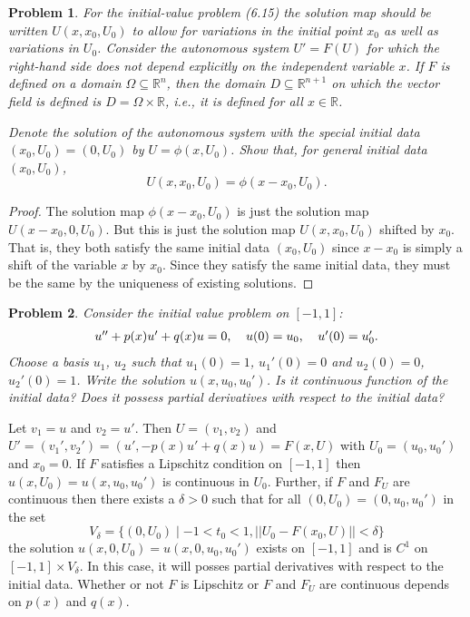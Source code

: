 \documentclass{article}
\newtheorem{problem}{Problem}
\begin{document}
\begin{problem}
For the initial-value problem (6.15) the solution map should be written $U(x,x_0,U_0)$ to allow for variations in the initial point $x_0$ as well as variations in $U_0$. Consider the \emph{autonomous} system $U' = F(U)$ for which the right-hand side does not depend explicitly on the independent variable $x$. If $F$ is defined on a domain $\Omega \subseteq \mathbb{R}^n$, then the domain $D \subseteq \mathbb{R}^{n+1}$ on which the vector field is defined is $D = \Omega \times \mathbb{R}$, i.e., it is defined for all $x \in \mathbb{R}$.

Denote the solution of the autonomous system with the special initial data $(x_0, U_0) = (0, U_0)$ by $U = \phi(x, U_0)$. Show that, for general initial data $(x_0, U_0)$,
\[
U(x,x_0,U_0) = \phi(x-x_0, U_0).
\]
\end{problem}
\begin{proof}
The solution map $\phi(x - x_0, U_0)$ is just the solution map $U(x-x_0, 0, U_0)$. But this is just the solution map $U(x, x_0, U_0)$ shifted by $x_0$. That is, they both satisfy the same initial data $(x_0, U_0)$ since $x - x_0$ is simply a shift of the variable $x$ by $x_0$. Since they satisfy the same initial data, they must be the same by the uniqueness of existing solutions.
\end{proof}

\begin{problem}
Consider the initial value problem on $[-1,1]$:
\[
\begin{tabular}{ccc}
$u'' + p(x)u' + q(x)u = 0$, & $u(0) = u_0$, & $u'(0) = u_0'$.
\end{tabular}
\]
Choose a basis $u_1$, $u_2$ such that $u_1(0) = 1$, $u_1'(0) = 0$ and $u_2(0) = 0$, $u_2'(0) = 1$. Write the solution $u(x,u_0,u_0')$. Is it continuous function of the initial data? Does it possess partial derivatives with respect to the initial data?
\end{problem}

Let $v_1 = u$ and $v_2 = u'$. Then $U = (v_1, v_2)$ and $U' = (v_1', v_2') = (u', -p(x)u' + q(x)u) = F(x,U)$ with $U_0 = (u_0, u_0')$ and $x_0 = 0$. If $F$ satisfies a Lipschitz condition on $[-1,1]$ then $u(x, U_0) = u(x, u_0, u_0')$ is continuous in $U_0$. Further, if $F$ and $F_U$ are continuous then there exists a $\delta > 0$ such that for all $(0, U_0) = (0, u_0, u_0')$ in the set
\[
V_{\delta} = \{ (0, U_0) \mid -1 < t_0 < 1, ||U_0 - F(x_0, U)|| < \delta \}
\]
the solution $u(x, 0, U_0) = u(x, 0, u_0, u_0')$ exists on $[-1,1]$ and is $C^1$ on $[-1,1] \times V_{\delta}$. In this case, it will posses partial derivatives with respect to the initial data. Whether or not $F$ is Lipschitz or $F$ and $F_U$ are continuous depends on $p(x)$ and $q(x)$.
\end{document}
